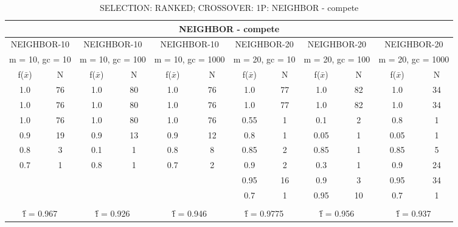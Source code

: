 \begin{table}[H]
	\centering
	\caption{SELECTION: RANKED; CROSSOVER: 1P: NEIGHBOR - compete}
	\begin{adjustbox}{width=1\textwidth}
		\begin{tabular}{ |c|c||c|c||c|c||c|c||c|c||c|c| }
			\hline
			\multicolumn{12}{|c|}{NEIGHBOR - compete} \\
			\hline
			\multicolumn{2}{|c||}{NEIGHBOR-10} & \multicolumn{2}{c||}{NEIGHBOR-10} & \multicolumn{2}{c||}{NEIGHBOR-10} & \multicolumn{2}{c||}{NEIGHBOR-20} & \multicolumn{2}{c||}{NEIGHBOR-20} & \multicolumn{2}{c|}{NEIGHBOR-20}\\
			\hline
			\multicolumn{2}{|c||}{m = 10, gc = 10} & \multicolumn{2}{c||}{m = 10, gc = 100} & \multicolumn{2}{c||}{m = 10, gc = 1000} & \multicolumn{2}{c||}{m = 20, gc = 10} & \multicolumn{2}{c||}{m = 20, gc = 100} & \multicolumn{2}{c|}{m = 20, gc = 1000}\\
			\hline
			f($\bar{x}$) & N & f($\bar{x}$) & N & f($\bar{x}$) & N & f($\bar{x}$) & N & f($\bar{x}$) & N & f($\bar{x}$) & N\\
			\hline
			\hline
			1.0 & 76 & 1.0 & 80 & 1.0 & 76 & 1.0 & 77 & 1.0 & 82 & 1.0 & 34\\
			\hline
			1.0 & 76 & 1.0 & 80 & 1.0 & 76 & 1.0 & 77 & 1.0 & 82 & 1.0 & 34\\
			1.0 & 76 & 1.0 & 80 & 1.0 & 76 & 0.55 & 1 & 0.1 & 2 & 0.8 & 1\\
			0.9 & 19 & 0.9 & 13 & 0.9 & 12 & 0.8 & 1 & 0.05 & 1 & 0.05 & 1\\
			0.8 & 3 & 0.1 & 1 & 0.8 & 8 & 0.85 & 2 & 0.85 & 1 & 0.85 & 5\\
			0.7 & 1 & 0.8 & 1 & 0.7 & 2 & 0.9 & 2 & 0.3 & 1 & 0.9 & 24\\
			&   &   &   &   &   & 0.95 & 16 & 0.9 & 3 & 0.95 & 34\\
			&   &   &   &   &   & 0.7 & 1 & 0.95 & 10 & 0.7 & 1\\
			&   &   &   &   &   &   &   &   &   &   &  \\
			\hline
			\multicolumn{2}{|c||}{\^{f} = 0.967} & \multicolumn{2}{c||}{\^{f} = 0.926} & \multicolumn{2}{c||}{\^{f} = 0.946} & \multicolumn{2}{c||}{\^{f} = 0.9775} & \multicolumn{2}{c||}{\^{f} = 0.956} & \multicolumn{2}{c|}{\^{f} = 0.937}\\
			\hline
		\end{tabular}
	\end{adjustbox}
\end{table}

